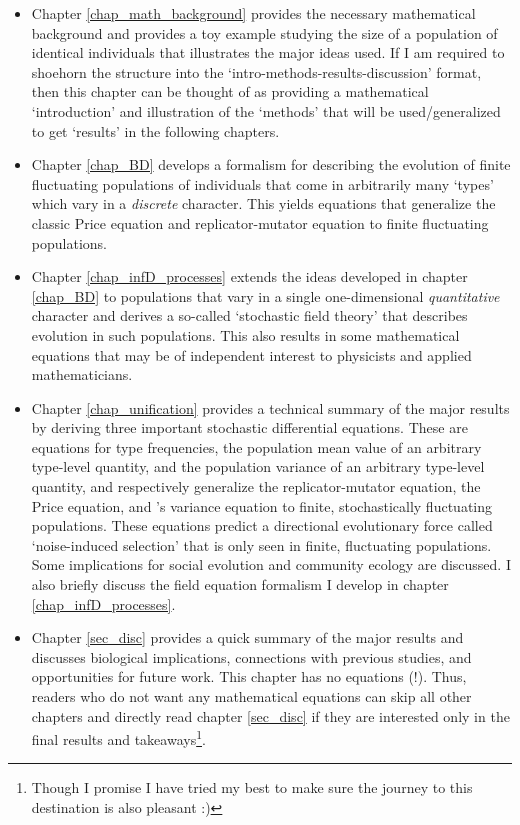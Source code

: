 \begin{itemize}
		\item Chapter \ref{chap_math_background} provides the necessary mathematical background and provides a toy example studying the size of a population of identical individuals that illustrates the major ideas used. If I am required to shoehorn the structure into the `intro-methods-results-discussion' format, then this chapter can be thought of as providing a mathematical `introduction' and illustration of the `methods' that will be used/generalized to get `results' in the following chapters.
		\item Chapter \ref{chap_BD} develops a formalism for describing the evolution of finite fluctuating populations of individuals that come in arbitrarily many `types' which vary in a \emph{discrete} character. This yields equations that generalize the classic Price equation and replicator-mutator equation to finite fluctuating populations.
		\item Chapter \ref{chap_infD_processes} extends the ideas developed in chapter \ref{chap_BD} to populations that vary in a single one-dimensional \emph{quantitative} character and derives a so-called `stochastic field theory' that describes evolution in such populations. This also results in some mathematical equations that may be of independent interest to physicists and applied mathematicians.
		\item Chapter \ref{chap_unification} provides a technical summary of the major results by deriving three important stochastic differential equations. These are equations for type frequencies, the population mean value of an arbitrary type-level quantity, and the population variance of an arbitrary type-level quantity, and respectively generalize the replicator-mutator equation, the Price equation, and \cite{lion_theoretical_2018}'s variance equation to finite, stochastically fluctuating populations. These equations predict a directional evolutionary force called `noise-induced selection' that is only seen in finite, fluctuating populations. Some implications for social evolution and community ecology are discussed. I also briefly discuss the field equation formalism I develop in chapter \ref{chap_infD_processes}.
		\item Chapter \ref{sec_disc} provides a quick summary of the major results and discusses biological implications, connections with previous studies, and opportunities for future work. This chapter has no equations (!). Thus, readers who do not want any mathematical equations can skip all other chapters and directly read chapter \ref{sec_disc} if they are interested only in the final results and takeaways\footnote{Though I promise I have tried my best to make sure the journey to this destination is also pleasant :)}. 
\end{itemize}

